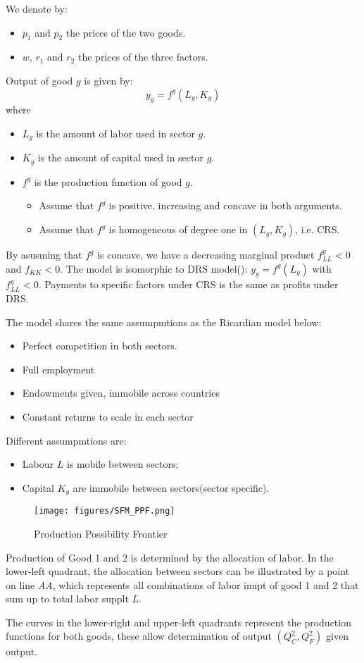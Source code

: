 We denote by:
\begin{itemize}
    \item $p_1$ and $p_2$ the prices of the two goods.
    \item $w$, $r_1$ and $r_2$ the prices of the three factors.
\end{itemize}
Output of good $g$ is given by:
\begin{equation*}
    y_g = f^g(L_g, K_g)
\end{equation*}
where
\begin{itemize}
    \item $L_g$ is the amount of labor used in sector $g$.
    \item $K_g$ is the amount of capital used in sector $g$.
    \item $f^g$ is the production function of good $g$.
        \begin{itemize}
            \item Assume that $f^g$ is positive, increasing and concave in both arguments.
            \item Assume that $f^g$ is homogeneous of degree one in $(L_g, K_g)$, i.e. CRS.
        \end{itemize}
\end{itemize}
By asusming that $f^g$ is concave, we have a decreasing marginal product $f_{LL}^g < 0$ and $f_{KK} < 0$.
The model is isomorphic to DRS model(\cite{dornbusch1977comparative}): $y_g = f^g(L_g)$ with $f_{LL}^g < 0$.
Payments to specific factors under CRS is the same as profits under DRS.

The model shares the same assumpmtions as the Ricardian model below:
\begin{itemize}
    \item Perfect competition in both sectors.
    \item Full employment
    \item Endowments given, immobile across countries
    \item Constant returns to scale in each sector
\end{itemize}
Different assumpmtions are:
\begin{itemize}
    \item Labour $L$ is mobile between sectors;
    \item Capital $K_g$ are immobile between sectors(sector specific).
\end{itemize}

\begin{figure}[htbp!]
    \centering
    \texttt{[image: figures/SFM\_PPF.png]}
    \caption{Production Possibility Frontier}
    \label{fig:lec4-1}
\end{figure}


Production of Good 1 and 2 is determined by the allocation of labor.
In the lower-left quadrant, the allocation between sectors can be illustrated by a point on line \textit{AA},
which represents all combinations of labor inupt of good 1 and 2 that sum up to total labor supplt $L$.

The curves in the lower-right and upper-left quadrants represent the production functions for both goods,
these allow determination of output $(Q_C^2, Q_F^2)$ given output.